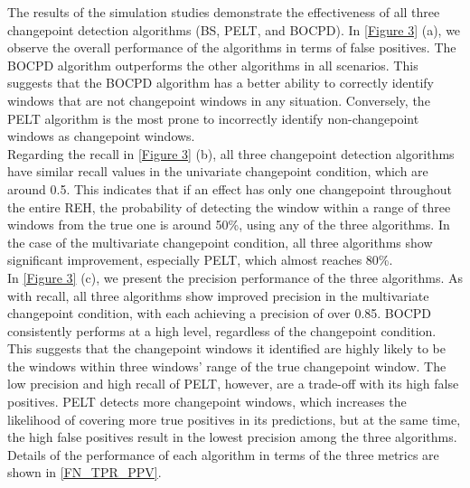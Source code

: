 \documentclass[]{interact}
\theoremstyle{plain}%
\theoremstyle{definition}
\theoremstyle{remark}
\begin{document}
	The results of the simulation studies demonstrate the effectiveness of all three changepoint detection algorithms (BS, PELT, and BOCPD). In \autoref{Figure 3} (a), we observe the overall performance of the algorithms in terms of false positives. The BOCPD algorithm outperforms the other algorithms in all scenarios. This suggests that the BOCPD algorithm has a better ability to correctly identify windows that are not changepoint windows in any situation. Conversely, the PELT algorithm is the most prone to incorrectly identify non-changepoint windows as changepoint windows. \\
	
	Regarding the recall in \autoref{Figure 3} (b), all three changepoint detection algorithms have similar recall values in the univariate changepoint condition, which are around 0.5. This indicates that if an effect has only one changepoint throughout the entire REH, the probability of detecting the window within a range of three windows from the true one is around 50\%, using any of the three algorithms. In the case of the multivariate changepoint condition, all three algorithms show significant improvement, especially PELT, which almost reaches 80\%. \\
	
	In \autoref{Figure 3} (c), we present the precision performance of the three algorithms. As with recall, all three algorithms show improved precision in the multivariate changepoint condition, with each achieving a precision of over 0.85. BOCPD consistently performs at a high level, regardless of the changepoint condition. This suggests that the changepoint windows it identified are highly likely to be the windows within three windows' range of the true changepoint window. The low precision and high recall of PELT, however, are a trade-off with its high false positives. PELT detects more changepoint windows, which increases the likelihood of covering more true positives in its predictions, but at the same time, the high false positives result in the lowest precision among the three algorithms. Details of the performance of each algorithm in terms of the three metrics are shown in \autoref{FN_TPR_PPV}.
	
\end{document}
